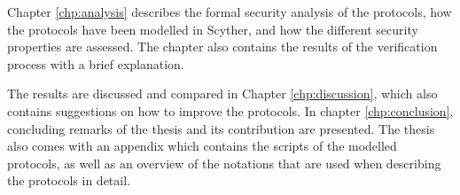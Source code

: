 Chapter \ref{chp:analysis} describes the formal security analysis of the protocols, how the protocols have been modelled in Scyther, and how the different security properties are assessed. The chapter also contains the results of the verification process with a brief explanation.

The results are discussed and compared in Chapter \ref{chp:discussion}, which also contains suggestions on how to improve the protocols.  In chapter \ref{chp:conclusion}, concluding remarks of the thesis and its contribution are presented. The thesis also comes with an appendix which contains the scripts of the modelled protocols, as well as an overview of the notations that are used when describing the protocols in detail.
